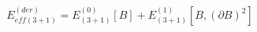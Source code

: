 \begin{equation}
E_{eff(3+1)}^{(der)}=E^{(0)}_{(3+1)}[B]+E^{(1)}_{(3+1)}[B,(\partial
B)^{2}]
\end{equation}

